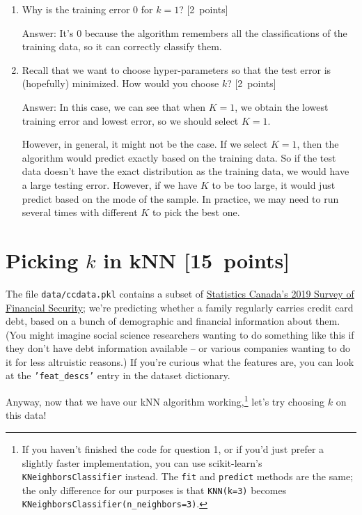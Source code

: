 \documentclass{article}
\newenvironment{answer}{\par\begingroup\color{gre}Answer: }{\endgroup}
\newcommand\pts[1]{\textcolor{pointscolour}{[#1~points]}}
\begin{document}
\begin{enumerate}
        \item Why is the training error $0$ for $k=1$? \pts{2}
        \begin{answer}
            It's 0 because the algorithm remembers all the classifications of the training data, so it can correctly classify them.
        \end{answer}
        
        \item Recall that we want to choose hyper-parameters so that the test error is (hopefully) minimized. How would you choose $k$? \pts{2}
        
        \begin{answer}
            In this case, we can see that when $K = 1$, we obtain the lowest training error and lowest error, so we should select $K = 1$.

            However, in general, it might not be the case. If we select $K = 1$, then the algorithm would predict exactly based on the training data. So if the test data doesn't have the exact distribution as the training data, we would have a large testing error. However, if we have $K$ to be too large, it would just predict based on the mode of the sample. In practice, we may need to run several times with different $K$ to pick the best one.
        \end{answer}
    \end{enumerate}

    \clearpage
    \section{Picking $k$ in kNN \pts{15}}
    The file \texttt{data/ccdata.pkl} contains a subset of \href{https://www23.statcan.gc.ca/imdb/p2SV.pl?Function=getSurvey&SDDS=2620}{Statistics Canada's 2019 Survey of Financial Security}; we're predicting whether a family regularly carries credit card debt, based on a bunch of demographic and financial information about them. (You might imagine social science researchers wanting to do something like this if they don't have debt information available -- or various companies wanting to do it for less altruistic reasons.) If you're curious what the features are, you can look at the \texttt{'feat\_descs'} entry in the dataset dictionary.

    Anyway, now that we have our kNN algorithm working,\footnote{If you haven't finished the code for question 1, or if you'd just prefer a slightly faster implementation, you can use scikit-learn's \texttt{KNeighborsClassifier} instead. The \texttt{fit} and \texttt{predict} methods are the same; the only difference for our purposes is that \texttt{KNN(k=3)} becomes \texttt{KNeighborsClassifier(n\_neighbors=3)}.} let's try choosing $k$ on this data!
\end{document}
